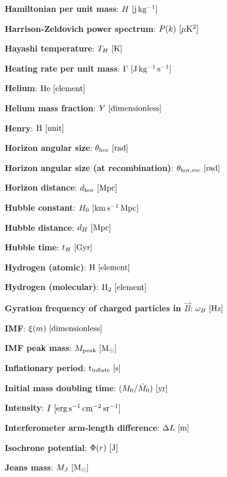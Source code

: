 \documentclass[a4paper,10pt]{article}
\begin{document}
{\noindent}\textbf{Hamiltonian per unit mass}: $H ~ [{\rm j\,kg^{-1}}]$

{\noindent}\textbf{Harrison-Zeldovich power spectrum}: $P(k) ~ [{\rm \mu K^2}]$

{\noindent}\textbf{Hayashi temperature}: $T_H ~ [{\rm K}]$

{\noindent}\textbf{Heating rate per unit mass}: $\Gamma ~ [{\rm J\,kg^{-1}\,s^{-1}}]$

{\noindent}\textbf{Helium}: ${\rm He} ~ [{\rm element}]$

{\noindent}\textbf{Helium mass fraction}: $Y ~ [{\rm dimensionless}]$

{\noindent}\textbf{Henry}: ${\rm H} ~ [{\rm unit}]$

{\noindent}\textbf{Horizon angular size}: $\theta_\mathrm{hor} ~ [{\rm rad}]$

{\noindent}\textbf{Horizon angular size (at recombination)}: $\theta_\mathrm{hor,rec} ~ [{\rm rad}]$

{\noindent}\textbf{Horizon distance}: $d_\mathrm{hor} ~ [{\rm Mpc}]$

{\noindent}\textbf{Hubble constant}: $H_0 ~ [{\rm km\,s^{-1}\,Mpc}]$

{\noindent}\textbf{Hubble distance}: $d_H ~ [{\rm Mpc}]$

{\noindent}\textbf{Hubble time}: $t_H ~ [{\rm Gyr}]$

{\noindent}\textbf{Hydrogen (atomic)}: ${\rm H} ~ [{\rm element}]$

{\noindent}\textbf{Hydrogen (molecular)}: ${\rm H_2} ~ [{\rm element}]$

{\noindent}\textbf{Gyration frequency of charged particles in $\vec{B}$}: $\omega_B ~ [{\rm Hz}]$

{\noindent}\textbf{IMF}: $\xi(m) ~ [{\rm dimensionless}]$

{\noindent}\textbf{IMF peak mass}: $M_\mathrm{peak} ~ [{\rm M_\odot}]$

{\noindent}\textbf{Inflationary period}: ${\rm t_\mathrm{inflate}} ~ [{\rm s}]$

{\noindent}\textbf{Initial mass doubling time}: $(M_0/\dot{M}_0) ~ [{\rm yr}]$

{\noindent}\textbf{Intensity}: $I ~ [{\rm erg\,s^{-1}\,cm^{-2}\,sr^{-1}}]$

{\noindent}\textbf{Interferometer arm-length difference}: $\Delta L ~ [{\rm m}]$

{\noindent}\textbf{Isochrone potential}: $\Phi(r) ~ [{\rm J}]$

{\noindent}\textbf{Jeans mass}: $M_J ~ [{\rm M_\odot}]$
\end{document}
